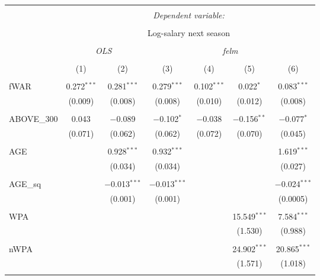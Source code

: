 
\begin{table}[!htbp] \centering
  \caption{}
  \label{}
  \scriptsize
\begin{tabular}{@{\extracolsep{5pt}}lcccccc}
\\[-1.8ex]\hline
\hline \\[-1.8ex]
 & \multicolumn{6}{c}{\textit{Dependent variable:}} \\
\cline{2-7}
\\[-1.8ex] & \multicolumn{6}{c}{Log-salary next season} \\
\\[-1.8ex] & \multicolumn{2}{c}{\textit{OLS}} & \multicolumn{4}{c}{\textit{felm}} \\
\\[-1.8ex] & (1) & (2) & (3) & (4) & (5) & (6)\\
\hline \\[-1.8ex]
 fWAR & 0.272$^{***}$ & 0.281$^{***}$ & 0.279$^{***}$ & 0.102$^{***}$ & 0.022$^{*}$ & 0.083$^{***}$ \\
  & (0.009) & (0.008) & (0.008) & (0.010) & (0.012) & (0.008) \\
  & & & & & & \\
 ABOVE\_300 & 0.043 & $-$0.089 & $-$0.102$^{*}$ & $-$0.038 & $-$0.156$^{**}$ & $-$0.077$^{*}$ \\
  & (0.071) & (0.062) & (0.062) & (0.072) & (0.070) & (0.045) \\
  & & & & & & \\
 AGE &  & 0.928$^{***}$ & 0.932$^{***}$ &  &  & 1.619$^{***}$ \\
  &  & (0.034) & (0.034) &  &  & (0.027) \\
  & & & & & & \\
 AGE\_sq &  & $-$0.013$^{***}$ & $-$0.013$^{***}$ &  &  & $-$0.024$^{***}$ \\
  &  & (0.001) & (0.001) &  &  & (0.0005) \\
  & & & & & & \\
 WPA &  &  &  &  & 15.549$^{***}$ & 7.584$^{***}$ \\
  &  &  &  &  & (1.530) & (0.988) \\
  & & & & & & \\
 nWPA &  &  &  &  & 24.902$^{***}$ & 20.865$^{***}$ \\
  &  &  &  &  & (1.571) & (1.018) \\
  & & & & & & \\

\end{tabular}
\end{table}
